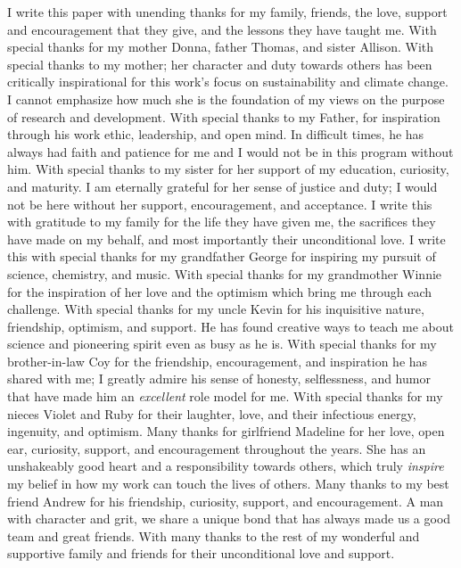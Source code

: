 
I write this paper with unending thanks for my family, friends, the love, support and encouragement that they give, and the lessons they have taught me. With special thanks for my mother Donna, father Thomas, and sister Allison. With special thanks to my mother; her character and duty towards others has been critically inspirational for this work's focus on sustainability and climate change. I cannot emphasize how much she is the foundation of my views on the purpose of research and development. With special thanks to my Father, for inspiration through his work ethic, leadership, and open mind. In difficult times, he has always had faith and patience for me and I would not be in this program without him. With special thanks to my sister for her support of my education, curiosity, and maturity. I am eternally grateful for her sense of justice and duty; I would not be here without her support, encouragement, and acceptance. I write this with gratitude to my family for the life they have given me, the sacrifices they have made on my behalf, and most importantly their unconditional love. I write this with special thanks for my grandfather George for inspiring my pursuit of science, chemistry, and music. With special thanks for my grandmother Winnie for the inspiration of her love and the optimism which bring me through each challenge. With special thanks for my uncle Kevin for his inquisitive nature, friendship, optimism, and support. He has found creative ways to teach me about science and pioneering spirit even as busy as he is. With special thanks for my brother-in-law Coy for the friendship, encouragement, and inspiration he has shared with me; I greatly admire his sense of honesty, selflessness, and humor that have made him an \textit{excellent} role model for me. With special thanks for my nieces Violet and Ruby for their laughter, love, and their infectious energy, ingenuity, and optimism. Many thanks for girlfriend Madeline for her love, open ear, curiosity, support, and encouragement throughout the years. She has an unshakeably good heart and a responsibility towards others, which truly \textit{inspire} my belief in how my work can touch the lives of others. Many thanks to my best friend Andrew for his friendship, curiosity, support, and encouragement. A man with character and grit, we share a unique bond that has always made us a good team and great friends. With many thanks to the rest of my wonderful and supportive family and friends for their unconditional love and support. 


